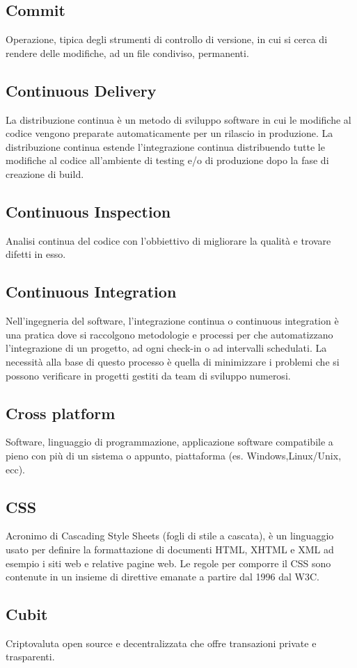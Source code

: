 \subsection{Commit}
Operazione, tipica degli strumenti di controllo di versione, in cui si cerca di rendere delle modifiche, ad un file condiviso, permanenti.

\subsection{Continuous Delivery}
La distribuzione continua è un metodo di sviluppo software in cui le modifiche al codice vengono preparate automaticamente per un rilascio in produzione. La distribuzione continua estende l'integrazione continua distribuendo tutte le modifiche al codice all'ambiente di testing e/o di produzione dopo la fase di creazione di build.

\subsection{Continuous Inspection}
Analisi continua del codice con l'obbiettivo di migliorare la qualità e trovare difetti in esso.

\subsection{Continuous Integration}
Nell'ingegneria del software, l'integrazione continua o continuous integration è una pratica dove si raccolgono metodologie e processi per che automatizzano l’integrazione di un progetto, ad ogni check-in o ad intervalli schedulati. La necessità alla base di questo processo è quella di minimizzare i problemi che si possono verificare in progetti gestiti da team di sviluppo numerosi.

\subsection{Cross platform}
Software, linguaggio di programmazione, applicazione software compatibile a pieno con più di un sistema o appunto, piattaforma (es. Windows,Linux/Unix, ecc).

\subsection{CSS}
Acronimo di Cascading Style Sheets (fogli di stile a cascata), è un linguaggio usato per definire la formattazione di documenti HTML, XHTML e XML ad esempio i siti web e relative pagine web. Le regole per comporre il CSS sono contenute in un insieme di direttive emanate a partire dal 1996 dal W3C.

\subsection{Cubit}
Criptovaluta open source e decentralizzata che offre transazioni private e trasparenti.
